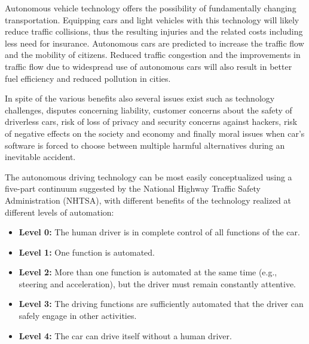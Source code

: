 \documentclass[12pt,english]{article}
\begin{document}
Autonomous vehicle technology offers the possibility of fundamentally
changing transportation. Equipping cars and light vehicles
with this technology will likely reduce traffic collisions, thus the resulting injuries and the related costs including less need for insurance. Autonomous cars are predicted to increase the traffic flow and the mobility of citizens. Reduced traffic congestion and the improvements in traffic flow due to widespread use of autonomous cars will also result in better fuel efficiency and reduced pollution in cities.

In spite of the various benefits also several issues exist such as technology challenges, disputes concerning liability, customer concerns about the safety of driverless cars, risk of loss of privacy and security concerns against hackers, risk of negative effects on the society and economy and finally moral issues when car's software is forced to choose between multiple harmful alternatives during an inevitable accident. \cite{wiki}
 

The autonomous driving technology can be most easily conceptualized using a five-part
continuum suggested by the National Highway Traffic Safety Administration
(NHTSA), with different benefits of the technology realized
at different levels of automation:
\begin{itemize}
	\item \textbf{Level 0:}  The human driver is in complete control of all functions of the car.
	\item \textbf{Level 1:}  One function is automated.
	\item \textbf{Level 2:}  More than one function is automated at the same time (e.g., steering and acceleration), but the driver must remain constantly attentive.
	\item \textbf{Level 3:} The driving functions are sufficiently automated that the driver can safely engage in other activities.
	\item \textbf{Level 4:} The car can drive itself without a human driver.\cite{c}
\end{itemize}
\noindent
\end{document}

